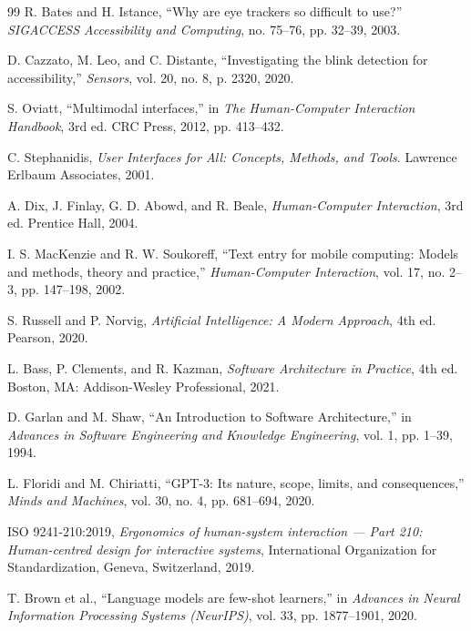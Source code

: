 \documentclass[twoside, a4paper, 11pt]{article}
\begin{document}
\begin{thebibliography}{99}
R. Bates and H. Istance, ``Why are eye trackers so difficult to use?'' \emph{SIGACCESS Accessibility and Computing}, no. 75--76, pp. 32--39, 2003.

D. Cazzato, M. Leo, and C. Distante, ``Investigating the blink detection for accessibility,'' \emph{Sensors}, vol. 20, no. 8, p. 2320, 2020.

S. Oviatt, ``Multimodal interfaces,'' in \emph{The Human-Computer Interaction Handbook}, 3rd ed. CRC Press, 2012, pp. 413--432.

C. Stephanidis, \emph{User Interfaces for All: Concepts, Methods, and Tools}. Lawrence Erlbaum Associates, 2001.

A. Dix, J. Finlay, G. D. Abowd, and R. Beale, \emph{Human-Computer Interaction}, 3rd ed. Prentice Hall, 2004.

I. S. MacKenzie and R. W. Soukoreff, ``Text entry for mobile computing: Models and methods, theory and practice,'' \emph{Human-Computer Interaction}, vol. 17, no. 2--3, pp. 147--198, 2002.

S. Russell and P. Norvig, \emph{Artificial Intelligence: A Modern Approach}, 4th ed. Pearson, 2020.

L. Bass, P. Clements, and R. Kazman, \emph{Software Architecture in Practice}, 4th ed. Boston, MA: Addison-Wesley Professional, 2021.

D. Garlan and M. Shaw, ``An Introduction to Software Architecture,'' in \emph{Advances in Software Engineering and Knowledge Engineering}, vol. 1, pp. 1--39, 1994.

L. Floridi and M. Chiriatti, ``GPT-3: Its nature, scope, limits, and consequences,'' \emph{Minds and Machines}, vol. 30, no. 4, pp. 681--694, 2020.

ISO 9241-210:2019, \emph{Ergonomics of human-system interaction --- Part 210: Human-centred design for interactive systems}, International Organization for Standardization, Geneva, Switzerland, 2019.

T. Brown et al., ``Language models are few-shot learners,'' in \emph{Advances in Neural Information Processing Systems (NeurIPS)}, vol. 33, pp. 1877--1901, 2020.

\end{thebibliography}
\end{document}
